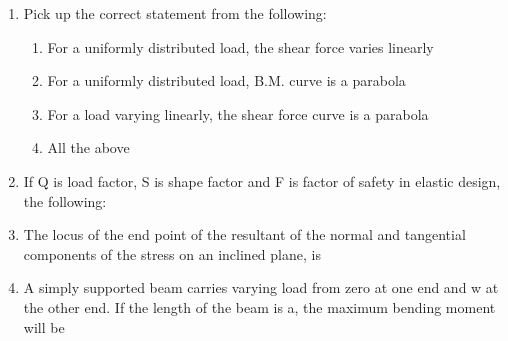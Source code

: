 \documentclass[11pt,a4paper]{article}
\begin{document}
\begin{enumerate}
\item{Pick up the correct statement from the following:}
\begin{enumerate}[label=\Alph*.]
\item{For a uniformly distributed load, the shear force varies linearly}
\item{For a uniformly distributed load, B.M. curve is a parabola}
\item{For a load varying linearly, the shear force curve is a parabola}
\item{All the above}
\end{enumerate}
\item{If Q is load factor, S is shape factor and F is factor of safety in elastic design, the following:}
\\
\item{The locus of the end point of the resultant of the normal and tangential components of the stress on an inclined plane, is}
\\
\item{A simply supported beam carries varying load from zero at one end and w at the other end. If the length of the beam is a, the maximum bending moment will be}
\\
\end{enumerate}
\end{document}
